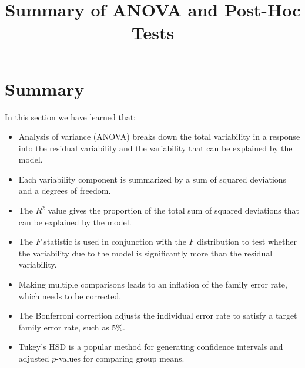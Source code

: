 \documentclass{article}
\title{Summary of ANOVA and Post-Hoc Tests}
\author{}
\date{}
\begin{document}
\maketitle

\section{Summary}

In this section we have learned that:

\begin{itemize}
    \item Analysis of variance (ANOVA) breaks down the total variability in a response into the residual variability and the variability that can be explained by the model.
    \item Each variability component is summarized by a sum of squared deviations and a degrees of freedom.
    \item The \( R^2 \) value gives the proportion of the total sum of squared deviations that can be explained by the model.
    \item The \( F \) statistic is used in conjunction with the \( F \) distribution to test whether the variability due to the model is significantly more than the residual variability.
    \item Making multiple comparisons leads to an inflation of the family error rate, which needs to be corrected.
    \item The Bonferroni correction adjusts the individual error rate to satisfy a target family error rate, such as 5\%.
    \item Tukey’s HSD is a popular method for generating confidence intervals and adjusted \( p \)-values for comparing group means.
\end{itemize}
\end{document}
